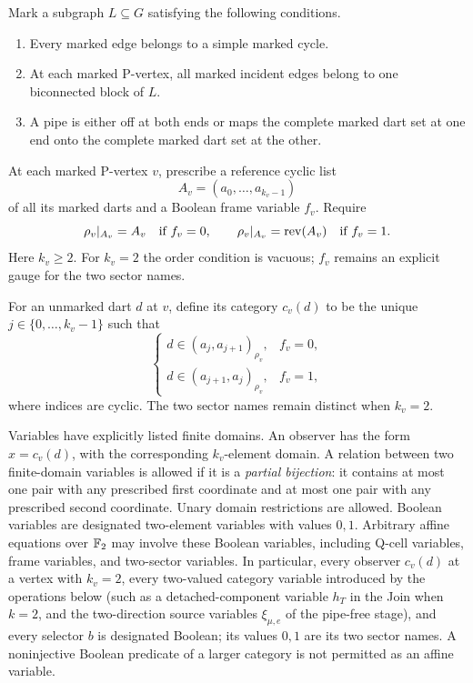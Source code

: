 \begin{definition}
\label{cse:definition}
Mark a subgraph $L\subseteq G$ satisfying the following conditions.
\begin{enumerate}
\item Every marked edge belongs to a simple marked cycle.
\item At each marked P-vertex, all marked incident edges belong to one
      biconnected block of $L$.
\item A pipe is either off at both ends or maps the complete marked dart
      set at one end onto the complete marked dart set at the other.
\end{enumerate}
At each marked P-vertex $v$, prescribe a reference cyclic list
\[
 A_v=(a_0,\ldots,a_{k_v-1})
\]
of all its marked darts and a Boolean frame variable $f_v$. Require
\[
 \rho_v|_{A_v}=A_v\quad\text{if }f_v=0,
 \qquad
 \rho_v|_{A_v}=\operatorname{rev}(A_v)\quad\text{if }f_v=1.
\]
Here $k_v\ge2$. For $k_v=2$ the order condition is vacuous; $f_v$ remains
an explicit gauge for the two sector names.

For an unmarked dart $d$ at $v$, define its category $c_v(d)$ to be the
unique $j\in\{0,\ldots,k_v-1\}$ such that
\[
 \begin{cases}
 d\in(a_j,a_{j+1})_{\rho_v},&f_v=0,\\
 d\in(a_{j+1},a_j)_{\rho_v},&f_v=1,
 \end{cases}
\]
where indices are cyclic. The two sector names remain distinct when
$k_v=2$.

Variables have explicitly listed finite domains. An observer has the form
$x=c_v(d)$, with the corresponding $k_v$-element domain. A relation between
two finite-domain variables is allowed if it is a \emph{partial bijection}:
it contains at most one pair with any prescribed first coordinate and at
most one pair with any prescribed second coordinate. Unary domain
restrictions are allowed. Boolean variables are designated two-element
variables with values $0,1$. Arbitrary affine equations over $\mathbb F_2$ may
involve these Boolean variables, including Q-cell variables, frame
variables, and two-sector variables. In particular, every observer
$c_v(d)$ at a vertex with $k_v=2$, every two-valued category variable
introduced by the operations below (such as a detached-component variable
$h_T$ in the Join when $k=2$, and the two-direction source variables
$\xi_{\mu,e}$ of the pipe-free stage), and every selector $b$ is designated
Boolean; its values $0,1$ are its two sector names. A noninjective Boolean
predicate of a larger category is not permitted as an affine variable.
\end{definition}

